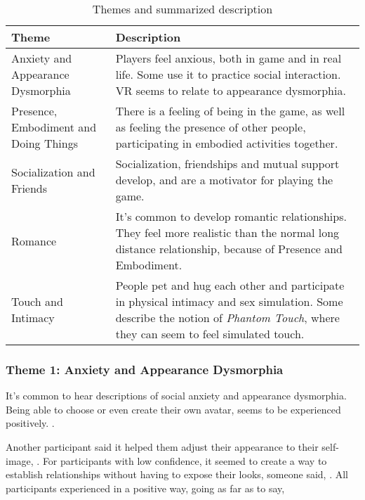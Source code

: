 \begin{table}[t]
  \caption{Themes and summarized description}
  \label{tab:themes}
  \begin{tabularx}{\textwidth}{lX}
    \toprule
    Theme&Description\\
    \midrule
     Anxiety and Appearance Dysmorphia & Players feel anxious, both in game and in real life. Some use it to practice social interaction. VR seems to relate to appearance dysmorphia.\\
     Presence, Embodiment and Doing Things & There is a feeling of being in the game, as well as feeling the presence of other people, participating in embodied activities together.\\
     Socialization and Friends & Socialization, friendships and mutual support develop, and are a motivator for playing the game.\\
     Romance & It's common to develop romantic relationships. They feel more realistic than the normal long distance relationship, because of Presence and Embodiment.\\
     Touch and Intimacy & People pet and hug each other and participate in physical intimacy and sex simulation. Some describe the notion of \emph{Phantom Touch}, where they can seem to feel simulated touch.\\
  \bottomrule
\end{tabularx}
\end{table}


\subsubsection{Theme 1: Anxiety and Appearance Dysmorphia}\label{theme:anxiety_dysmorphia}
It's common to hear descriptions of social anxiety and appearance dysmorphia.
Being able to choose or even create their own avatar, seems to be experienced positively.
.


Another participant said it helped them adjust their appearance to their self-image,
.
For participants with low confidence, it seemed to create a way to establish relationships without having to expose their looks, someone said,
.
All participants experienced in a positive way, going as far as to say,

